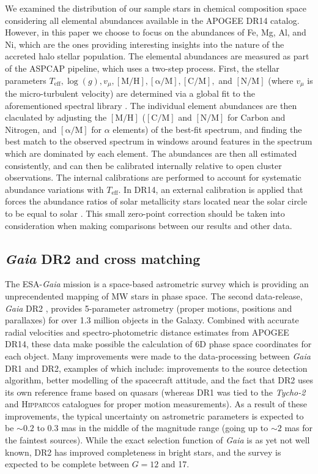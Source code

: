 We examined the distribution of our sample stars in chemical
composition space considering all elemental abundances available
in the APOGEE DR14 catalog.  However, in this paper we choose to focus on
the abundances of Fe, Mg, Al, and Ni, which are the ones providing
interesting insights into the nature of the accreted halo stellar
population. The elemental abundances are measured as part of the
ASPCAP pipeline, which uses a two-step process. First, the stellar
parameters $T_{\mathrm{eff}}, \log(g), v_\mu, \mathrm{[M/H]},
\mathrm{[\alpha/M]}, \mathrm{[C/M]},$ and $\mathrm{[N/M]}$ (where $v_\mu$ is the micro-turbulent velocity) are
determined via a global fit to the aforementioned spectral library
\citep{2015AJ....149..181Z}. The individual element abundances are then claculated by
adjusting the $\mathrm{[M/H]}$ ($\mathrm{[C/M]}$ and $\mathrm{[N/M]}$ for Carbon and Nitrogen, and $\mathrm{[\alpha/M]}$ for $\alpha$
elements) of the best-fit spectrum, and finding the best match to the
observed spectrum in windows around features in the spectrum which
are dominated by each element. The abundances are then all estimated consistently, and can then be calibrated internally relative
to open cluster observations. The internal calibrations are performed
to account for systematic abundance variations with $T_\mathrm{eff}$.
In DR14, an external calibration is applied that
forces the abundance ratios of solar metallicity stars located near the
solar circle to be equal to solar \citep[][in press]{holtzdr14}.
This small zero-point correction should be taken into consideration
when making comparisons between our results and other data.



\subsection{\emph{Gaia} DR2 and cross matching}

The ESA-\emph{Gaia} mission is a space-based astrometric survey
which is providing an unprecendented mapping of MW stars in
phase space. The second data-release, \emph{Gaia} DR2
\citep{2018arXiv180409365G}, provides 5-parameter astrometry (proper
motions, positions and parallaxes) for over 1.3 million objects in
the Galaxy.  Combined with accurate radial velocities and spectro-photometric distance estimates from
APOGEE DR14, these data make possible the calculation of 6D phase
space coordinates for each object.
Many improvements were made to the data-processing between \emph{Gaia}
DR1 \citep{2016arXiv160904303L} and DR2, examples of which include:
improvements to the source detection algorithm, better modelling
of the spacecraft attitude, and the fact that DR2 uses its own
reference frame based on quasars (whereas DR1 was tied to the
\emph{Tycho-2} and \textsc{Hipparcos} catalogues for proper motion
measurements). As a result of these improvements, the typical
uncertainty on astrometric parameters is expected to be $\sim 0.2$
to $0.3$ mas in the middle of the magnitude range (going up
to $\sim 2$ mas for the faintest sources). While the exact selection
function of \emph{Gaia} is as yet not well known, DR2 has improved
completeness in bright stars, and the survey is expected to be
complete between $G=12$ and 17.

